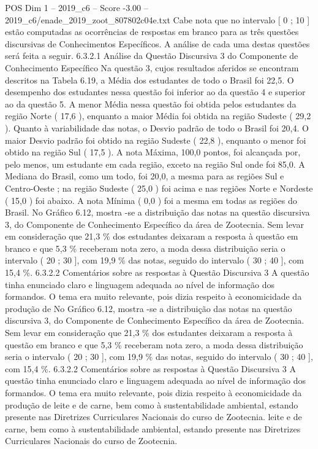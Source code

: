 \begin{textsample}{POS Dim 1 – 2019\_c6 – Score -3.00 – 2019\_c6/enade\_2019\_zoot\_807802c04e.txt}
Cabe nota que no intervalo [ 0 ; 10 ] estão computadas as ocorrências de respostas em branco para as três questões discursivas de Conhecimentos Específicos.
A análise de cada uma destas questões será feita a seguir. 6.3.2.1 Análise da Questão Discursiva 3 do Componente de Conhecimento Específico Na questão 3, cujos resultados aferidos se encontram descritos na Tabela 6.19, a Média dos estudantes de todo o Brasil foi 22,5.
O desempenho dos estudantes nessa questão foi inferior ao da questão 4 e superior ao da questão 5.
A menor Média nessa questão foi obtida pelos estudantes da região Norte ( 17,6 ), enquanto a maior Média foi obtida na região Sudeste ( 29,2 ).
Quanto à variabilidade das notas, o Desvio padrão de todo o Brasil foi 20,4.
O maior Desvio padrão foi obtido na região Sudeste ( 22,8 ), enquanto o menor foi obtido na região Sul ( 17,5 ).
A nota Máxima, 100,0 pontos, foi alcançada por, pelo menos, um estudante em cada região, exceto na região Sul onde foi 85,0.
A Mediana do Brasil, como um todo, foi 20,0, a mesma para as regiões Sul e Centro-Oeste ; na região Sudeste ( 25,0 ) foi acima e nas regiões Norte e Nordeste ( 15,0 ) foi abaixo.
A nota Mínima ( 0,0 ) foi a mesma em todas as regiões do Brasil.
No Gráfico 6.12, mostra -se a distribuição das notas na questão discursiva 3, do Componente de Conhecimento Específico da área de Zootecnia.
Sem levar em consideração que 21,3 \% dos estudantes deixaram a resposta à questão em branco e que 5,3 \% receberam nota zero, a moda dessa distribuição seria o intervalo ( 20 ; 30 ], com 19,9 \% das notas, seguido do intervalo ( 30 ; 40 ], com 15,4 \%. 6.3.2.2 Comentários sobre as respostas à Questão Discursiva 3 A questão tinha enunciado claro e linguagem adequada ao nível de informação dos formandos.
O tema era muito relevante, pois dizia respeito à economicidade da produção de No Gráfico 6.12, mostra -se a distribuição das notas na questão discursiva 3, do Componente de Conhecimento Específico da área de Zootecnia.
Sem levar em consideração que 21,3 \% dos estudantes deixaram a resposta à questão em branco e que 5,3 \% receberam nota zero, a moda dessa distribuição seria o intervalo ( 20 ; 30 ], com 19,9 \% das notas, seguido do intervalo ( 30 ; 40 ], com 15,4 \%. 6.3.2.2 Comentários sobre as respostas à Questão Discursiva 3 A questão tinha enunciado claro e linguagem adequada ao nível de informação dos formandos.
O tema era muito relevante, pois dizia respeito à economicidade da produção de leite e de carne, bem como à sustentabilidade ambiental, estando presente nas Diretrizes Curriculares Nacionais do curso de Zootecnia. leite e de carne, bem como à sustentabilidade ambiental, estando presente nas Diretrizes Curriculares Nacionais do curso de Zootecnia.

\end{textsample}
